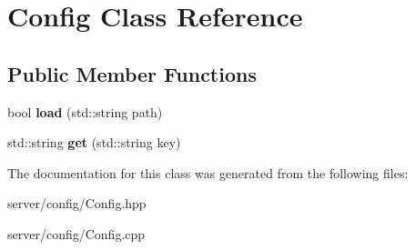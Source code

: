 \hypertarget{class_config}{\section{Config Class Reference}
\label{class_config}
}
\subsection*{Public Member Functions}
\begin{DoxyCompactItemize}
\item 
\hypertarget{class_config_a282cfecfe72df1c6a0a7b68667b8bbc7}{bool {\bfseries load} (std\-::string path)}\label{class_config_a282cfecfe72df1c6a0a7b68667b8bbc7}

\item 
\hypertarget{class_config_a3c55d333e4f503cf0de93e6e4e229592}{std\-::string {\bfseries get} (std\-::string key)}\label{class_config_a3c55d333e4f503cf0de93e6e4e229592}

\end{DoxyCompactItemize}


The documentation for this class was generated from the following files\-:\begin{DoxyCompactItemize}
\item 
server/config/Config.\-hpp\item 
server/config/Config.\-cpp\end{DoxyCompactItemize}
